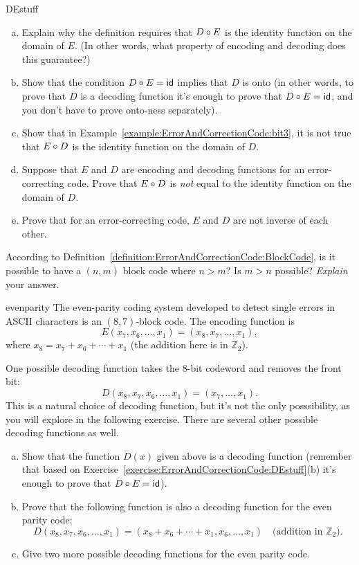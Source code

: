 \begin{exercise}{DEstuff}
\begin{enumerate}[(a)]
\item
Explain why the definition requires that $D \circ E$ is the identity function on the domain of $E$. (In other words, what property of encoding and decoding does this guarantee?)
\item
Show that the condition $D \circ E = \sf{id}$ implies that $D$ is onto  (in other words, to prove that $D$ is a decoding function it's enough to prove that $D \circ E = \sf{id}$, and you don't have to prove onto-ness separately).
\item
Show that in Example~\ref{example:ErrorAndCorrectionCode:bit3}, it is not true that $E \circ D$ is the identity function on the domain of $D$.
\item
Suppose that  $E$ and $D$ are  encoding and decoding functions for an error-correcting code. Prove that $E \circ D$ is \emph{not} equal to the identity function on the domain of $D$.
\item
Prove that for an error-correcting code, $E$ and $D$ are not inverse of each other. 
\end{enumerate}
\end{exercise}

\begin{exercise}{}
According to Definition~\ref{definition:ErrorAndCorrectionCode:BlockCode}, is it possible to have a $(n,m)$ block code where $n > m$? Is $m > n$ possible? \emph{Explain} your answer.
\end{exercise}
 
\begin{example}{evenparity}
The even-parity coding system developed to detect single errors in
ASCII characters is an $(8,7)$-block code. The encoding function is
\[
E(x_7, x_6, \ldots, x_1) = (x_8, x_7,  \ldots, x_1),
\]
where $x_8 = x_7 + x_6 + \cdots + x_1$ (the addition here is in $\mathbb{Z}_2$). 

One possible decoding function takes the 8-bit codeword and removes the front bit:
\[
D(x_8,x_7, x_6, \ldots, x_1) = (x_7,  \ldots, x_1).
\]
This is a natural choice of decoding function, but it's not the only posssibility, as you will explore in the following exercise.
There are several other possible decoding functions as well.  
\end{example}
\begin{exercise}{}
\begin{enumerate}[(a)]
\item
Show that the function $D(x)$ given above is a decoding function (remember that based on Exercise~\ref{exercise:ErrorAndCorrectionCode:DEstuff}(b) it's enough to prove that $D \circ E = \sf{id}$). 
\item
Prove that the following function is also a decoding function for the even parity code:
\[
D(x_8,x_7, x_6, \ldots, x_1) = ( x_8 + x_6 + \cdots + x_1, x_6,  \ldots, x_1)\quad \textrm{(addition in }\mathbb{Z}_2).
\]
\item
Give two more possible decoding functions for the even parity code.
\end{enumerate}
\end{exercise}

